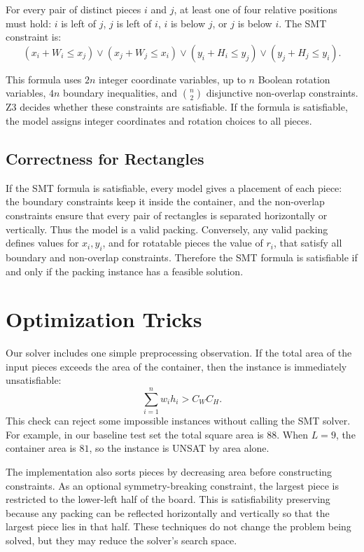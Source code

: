 \documentclass[11pt]{article}
\begin{document}
For every pair of distinct pieces \(i\) and \(j\), at least one of four
relative positions must hold: \(i\) is left of \(j\), \(j\) is left of \(i\),
\(i\) is below \(j\), or \(j\) is below \(i\). The SMT constraint is:
\[
(x_i+W_i \leq x_j)
\vee
(x_j+W_j \leq x_i)
\vee
(y_i+H_i \leq y_j)
\vee
(y_j+H_j \leq y_i).
\]

This formula uses \(2n\) integer coordinate variables, up to \(n\) Boolean
rotation variables, \(4n\) boundary inequalities, and \(\binom{n}{2}\)
disjunctive non-overlap constraints. Z3 \cite{deMoura2008z3} decides whether these constraints are
satisfiable. If the formula is satisfiable, the model assigns integer
coordinates and rotation choices to all pieces.

\subsection{Correctness for Rectangles}

If the SMT formula is satisfiable, every model gives a placement of each piece:
the boundary constraints keep it inside the container, and the non-overlap
constraints ensure that every pair of rectangles is separated horizontally or
vertically. Thus the model is a valid packing. Conversely, any valid packing
defines values for \(x_i,y_i\), and for rotatable pieces the value of \(r_i\),
that satisfy all boundary and non-overlap constraints. Therefore the SMT
formula is satisfiable if and only if the packing instance has a feasible
solution.

\section{Optimization Tricks}

Our solver includes one simple preprocessing observation. If the total area of
the input pieces exceeds the area of the container, then the instance is
immediately unsatisfiable:
\[
\sum_{i=1}^{n} w_i h_i > C_W C_H.
\]
This check can reject some impossible instances without calling the SMT
solver. For example, in our baseline test set the total square area is \(88\).
When \(L=9\), the container area is \(81\), so the instance is UNSAT by area
alone.

The implementation also sorts pieces by decreasing area before constructing
constraints. As an optional symmetry-breaking constraint, the largest piece is
restricted to the lower-left half of the board. This is satisfiability
preserving because any packing can be reflected horizontally and vertically so
that the largest piece lies in that half. These techniques do not change the
problem being solved, but they may reduce the solver's search space.
\end{document}
